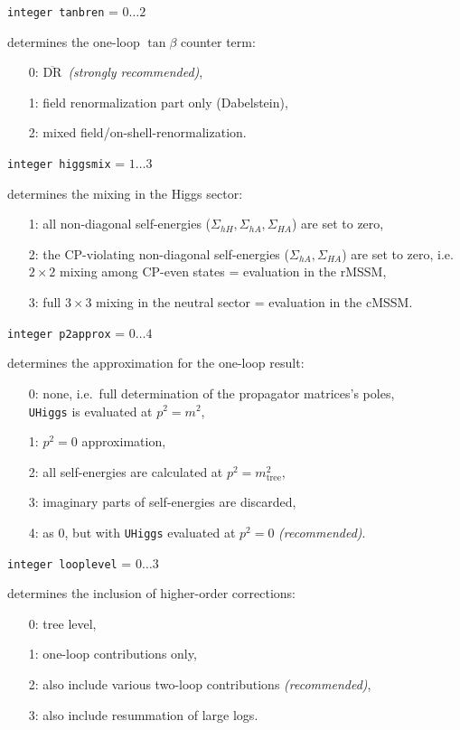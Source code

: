 \documentclass[12pt,a4paper]{report}
\newcommand{\overbar}[1]{\ensuremath{\overline{\mathrm{#1}}}}
\newcommand{\CODE}[1]{\texttt{#1}}
\newcommand{\FLAGIN}[3]{%
  \item[\fbox{\scriptsize\textsc{in}}]
  \CODE{#1} = $#2\dots#3$ \par}
\newcommand\ie{i.e.\ }
\begin{document}
\FLAGIN{integer tanbren}{0}{2}
determines the one-loop $\tan\beta$ counter term:
\begin{itemize}
\item[0:] \overbar{DR}\ \textit{(strongly recommended)},
\item[1:] field renormalization part only (Dabelstein),
\item[2:] mixed field/on-shell-renormalization.
\end{itemize}

\FLAGIN{integer higgsmix}{1}{3}
determines the mixing in the Higgs sector:
\begin{itemize}
\item[1:] all non-diagonal self-energies ($\Sigma_{hH}, \Sigma_{hA}, 
          \Sigma_{HA}$) are set to zero,
\item[2:] the CP-violating non-diagonal self-energies ($\Sigma_{hA}, 
          \Sigma_{HA}$) are set to zero, \ie $2\times 2$ mixing among 
          CP-even states = evaluation in the rMSSM,
\item[3:] full $3\times 3$ mixing in the neutral sector
          = evaluation in the cMSSM.
\end{itemize}

\FLAGIN{integer p2approx}{0}{4}
determines the approximation for the one-loop result:
\begin{itemize}
\item[0:] none, \ie full determination of the propagator matrices's poles, \\
  \CODE{UHiggs} is evaluated at $p^2 = m^2$,
\item[1:] $p^2 = 0$ approximation,
\item[2:] all self-energies are calculated at $p^2 = m_{\text{tree}}^2$,
\item[3:] imaginary parts of self-energies are discarded,
\item[4:] as 0, but with \CODE{UHiggs} evaluated at $p^2 = 0$
  \textit{(recommended)}.
\end{itemize}

\FLAGIN{integer looplevel}{0}{3}
determines the inclusion of higher-order corrections:
\begin{itemize}
\item[0:] tree level,
\item[1:] one-loop contributions only,
\item[2:] also include various two-loop contributions
  \textit{(recommended)},
\item[3:] also include resummation of large logs.
\end{itemize}
\end{document}
